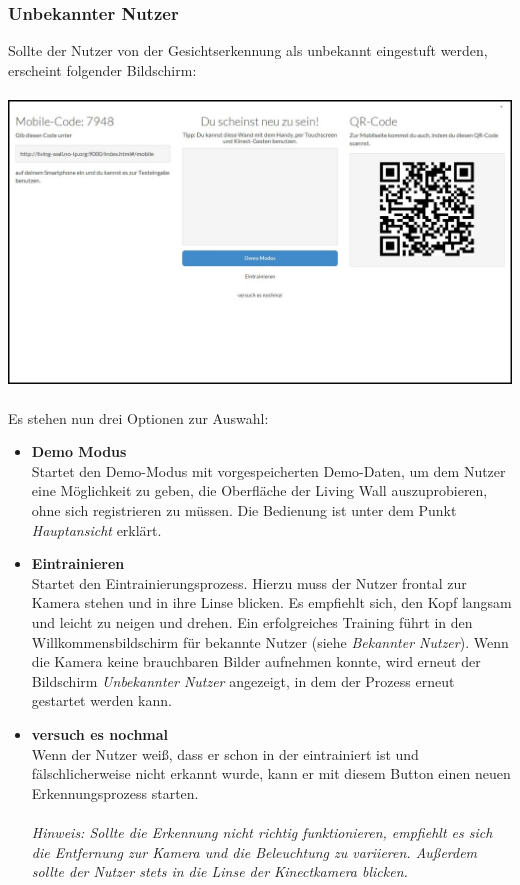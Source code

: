 \documentclass[10pt,a4paper]{report}
\begin{document}
		\subsubsection{Unbekannter Nutzer}
		Sollte der Nutzer von der Gesichtserkennung als unbekannt eingestuft werden, erscheint folgender Bildschirm:\\\\
		\includegraphics[scale=0.31]{UnknownUser}\\\\
		Es stehen nun drei Optionen zur Auswahl:
			\begin{itemize}
				\item \textbf{Demo Modus}\\
				Startet den Demo-Modus mit vorgespeicherten Demo-Daten, um dem Nutzer eine Möglichkeit zu geben, die Oberfläche der Living Wall auszuprobieren, ohne sich registrieren zu müssen. Die Bedienung ist unter dem Punkt 		\textit{Hauptansicht} erklärt.
				\item \textbf{Eintrainieren}\\
				Startet den Eintrainierungsprozess. Hierzu muss der Nutzer frontal zur Kamera stehen und in ihre Linse blicken. Es empfiehlt sich, den Kopf langsam und leicht zu neigen und drehen. Ein erfolgreiches Training führt in den Willkommensbildschirm für bekannte Nutzer (siehe \textit{Bekannter Nutzer}). Wenn die Kamera keine brauchbaren Bilder aufnehmen konnte, wird erneut der Bildschirm \textit{Unbekannter Nutzer} angezeigt, in dem der Prozess erneut gestartet werden kann.
				\item \textbf{versuch es nochmal}\\
				Wenn der Nutzer weiß, dass er schon in der eintrainiert ist und fälschlicherweise nicht erkannt wurde, kann er mit diesem Button einen neuen Erkennungsprozess starten.\\ \\
				\textit{Hinweis: Sollte die Erkennung nicht richtig funktionieren, empfiehlt es sich die Entfernung zur Kamera und die Beleuchtung zu variieren. Außerdem sollte der Nutzer stets in die Linse der Kinectkamera blicken.}
			\end{itemize}
\end{document}
